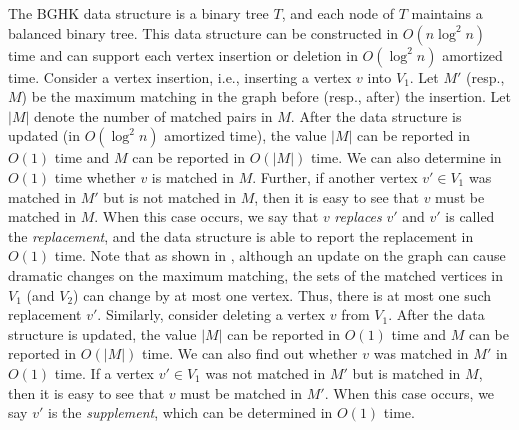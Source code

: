 \documentclass[11pt]{article}
\begin{document}
The BGHK data structure \cite{ref:BrodalDy07} is a binary tree $T$,
and each node of $T$ maintains a balanced binary tree. This data structure
can be constructed in $O(n\log^2 n)$ time and can
support each vertex insertion or deletion in $O(\log^2 n)$ amortized time.
Consider a vertex insertion, i.e., inserting a vertex $v$ into $V_1$. Let
$M'$ (resp., $M$) be the maximum matching in the graph before
(resp., after) the insertion. Let $|M|$ denote the number of matched
pairs in $M$.  After the data structure is updated (in $O(\log^2 n)$
amortized time), the value $|M|$ can be reported in $O(1)$ time
and $M$ can be reported in $O(|M|)$ time. We can also determine in
$O(1)$ time whether $v$ is matched in $M$. Further, if another
vertex $v'\in V_1$ was matched in $M'$ but is not matched in $M$,
then it is easy to see that $v$ must be matched in $M$. When this
case occurs, we say that $v$ {\em replaces} $v'$ and $v'$ is called
the {\em replacement}, and the data structure is able to report the
replacement in $O(1)$ time. Note that as shown in
\cite{ref:BrodalDy07}, although an update on the graph can cause
dramatic changes on the maximum matching, the sets of the
matched vertices in $V_1$ (and $V_2$) can change by at most one
vertex. Thus, there is at most one such replacement $v'$.  Similarly,
consider deleting a vertex $v$ from $V_1$. After the data structure
is updated, the value $|M|$ can be reported in $O(1)$ time and $M$
can be reported in $O(|M|)$ time. We can also find out whether $v$ was
matched in $M'$ in $O(1)$ time. If a vertex $v'\in V_1$ was not
matched in $M'$ but is matched in $M$,
then it is easy to see that $v$ must be matched in $M'$. When this
case occurs, we say $v'$ is the {\em
supplement}, which can be determined in $O(1)$ time.
\end{document}
